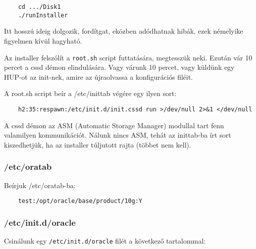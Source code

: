 \begin{verbatim}
    cd .../Disk1
    ./runInstaller
\end{verbatim}

Itt hosszú ideig dolgozik, fordítgat,
eközben adódhatnak hibák, ezek némelyike figyelmen
kívül hagyható.

Az installer felszólít a \verb!root.sh! script
futtatására, megtesszük neki. Ezután vár 10 percet
a cssd démon elindulására. Vagy várunk 10 percet,
vagy küldünk egy HUP-ot az init-nek, amire az újraolvassa
a konfigurációs filéit. 

A root.sh script beír a /etc/inittab végére egy ilyen sort:

\begin{verbatim}
    h2:35:respawn:/etc/init.d/init.cssd run >/dev/null 2>&1 </dev/null
\end{verbatim}

A cssd démon az ASM (Automatic Storage Manager) modullal
tart fenn valamilyen kommunikációt. Nálunk nincs ASM,
tehát az inittab-ba írt sort kiszedhetjük, ha az installer
túljutott rajta (többet nem kell).


\subsubsection*{/etc/oratab}


Beírjuk /etc/oratab-ba:

\begin{verbatim}
    test:/opt/oracle/base/product/10g:Y
\end{verbatim}


\subsubsection*{/etc/init.d/oracle}

Csinálunk egy \verb!/etc/init.d/oracle! filét
a következő tartalommal:


